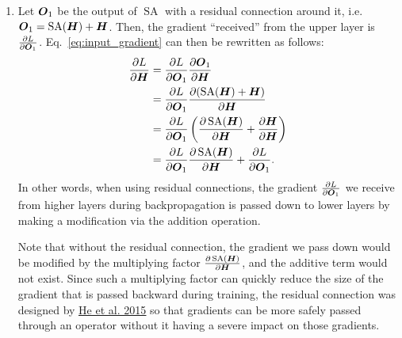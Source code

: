 \documentclass[11pt,a4paper]{article}
\newcommand\op[1]{\operatorname{#1}}
\begin{document}
\begin{enumerate}[label=(\alph*)]
          i.e.\ $\mH$.
    \item Let ${\boldsymbol{O}}_1$ be the output of $\op{SA}$ with a residual connection
          around it, i.e.\ $\mO_1 = \op{SA}(\mH) + \mH$.
          Then, the gradient ``received'' from the upper layer is
          $\frac{\partial L}{\partial {\boldsymbol{O}}_1}$.
          Eq.~\ref{eq:input_gradient} can then be rewritten as follows:
          \begin{align*}
              \frac{\partial L}{\partial \mH} & = \frac{\partial L}{\partial \mO_1}\frac{\partial \mO_1}{\partial \mH}                                                         \\
                                              & = \frac{\partial L}{\partial \mO_1}\frac{\partial (\op{SA}(\mH) + \mH)}{\partial \mH}                                          \\
                                              & = \frac{\partial L}{\partial \mO_1}\left(\frac{\partial \op{SA}(\mH)}{\partial \mH} + \frac{\partial \mH}{\partial \mH}\right) \\
                                              & = \frac{\partial L}{\partial \mO_1}\frac{\partial \op{SA}(\mH)}{\partial \mH} + \frac{\partial L}{\partial \mO_1}.
          \end{align*}
          In other words, when using residual connections, the gradient
          $\frac{\partial L}{\partial {\boldsymbol{O}}_1}$ we receive from higher layers
          during backpropagation is passed down to lower layers by making a
          modification via the addition operation.

          Note that without the residual connection, the gradient we pass down
          would be modified by the multiplying factor
          $\frac{\partial \op{SA}(\mH)}{\partial \mH}$, and the additive term
          would not exist.
          Since such a multiplying factor can quickly reduce the size of the
          gradient that is passed backward during training, the residual
          connection was designed by
          \href{https://arxiv.org/abs/1512.03385}{\underline{He et al. 2015}} so
          that gradients can be more safely passed through an operator without
          it having a severe impact on those gradients.


\end{enumerate}
\end{document}
